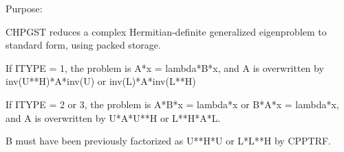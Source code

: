  \begin{DoxyParagraph}{Purpose\+: }
\begin{DoxyVerb} CHPGST reduces a complex Hermitian-definite generalized
 eigenproblem to standard form, using packed storage.

 If ITYPE = 1, the problem is A*x = lambda*B*x,
 and A is overwritten by inv(U**H)*A*inv(U) or inv(L)*A*inv(L**H)

 If ITYPE = 2 or 3, the problem is A*B*x = lambda*x or
 B*A*x = lambda*x, and A is overwritten by U*A*U**H or L**H*A*L.

 B must have been previously factorized as U**H*U or L*L**H by CPPTRF.\end{DoxyVerb}
 
\end{DoxyParagraph}

